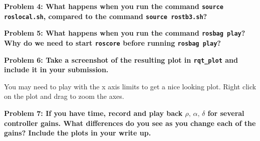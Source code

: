 \documentclass{article}
\begin{document}
\textbf{Problem 4: What happens when you run the command \texttt{source roslocal.sh}, compared to the command \texttt{source rostb3.sh}?}

\textbf{Problem 5: What happens when you run the command \texttt{rosbag play}? Why do we need to start \texttt{roscore} before running \texttt{rosbag play}?}

\textbf{Problem 6: Take a screenshot of the resulting plot in \texttt{rqt\_plot} and include it in your submission.}

You may need to play with the x axis limits to get a nice looking plot. Right click on the plot and drag to zoom the axes.

\textbf{Problem 7: If you have time, record and play back $\rho, \, \alpha, \, \delta$ for several controller gains. What differences do you see as you change each of the gains? Include the plots in your write up.}
\end{document}
